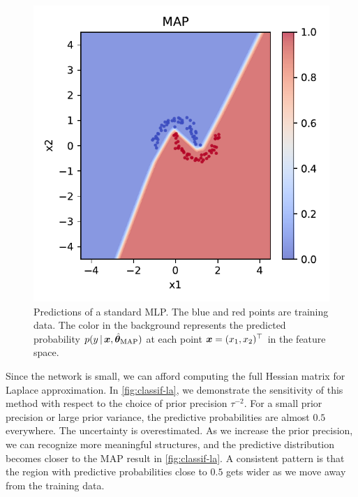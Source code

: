 \begin{figure}[tb]
  \centering
  \includegraphics{images/classif_map.pdf}
  \caption{Predictions of a standard MLP. The blue and red points are training data. The color in the background represents the predicted probability $p(y \,|\, \bm{x}, \hat{\bm{\theta}}_\text{MAP})$ at each point $\bm{x} = (x_1, x_2)^\top$ in the feature space.}
  \label{fig:classif-map}
\end{figure}

Since the network is small, we can afford computing the full Hessian matrix for Laplace approximation. In \cref{fig:classif-la}, we demonstrate the sensitivity of this method with respect to the choice of prior precision $\tau^{-2}$. For a small prior precision or large prior variance, the predictive probabilities are almost $0.5$ everywhere. The uncertainty is overestimated. As we increase the prior precision, we can recognize more meaningful structures, and the predictive distribution becomes closer to the MAP result in \cref{fig:classif-la}. A consistent pattern is that the region with predictive probabilities close to $0.5$ gets wider as we move away from the training data.

